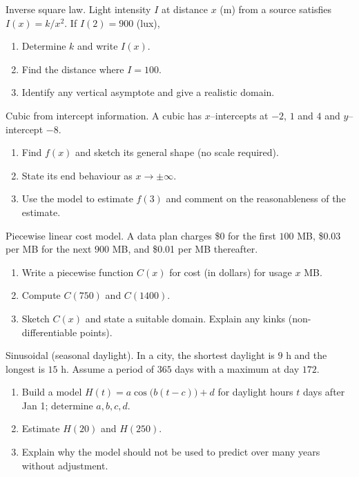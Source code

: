 \documentclass[11pt]{article}
\def\textbf#1{#1}%
\newcounter{question}
\begin{document}
\begin{question}
\textbf{Inverse square law.}
Light intensity $I$ at distance $x$ (m) from a source satisfies $I(x)=k/x^2$. If $I(2)=900$ (lux),
\begin{enumerate}
  \item Determine $k$ and write $I(x)$.
  \item Find the distance where $I=100$.
  \item Identify any vertical asymptote and give a realistic domain.
\end{enumerate}
\end{question}

\begin{question}
\textbf{Cubic from intercept information.}
A cubic has $x$–intercepts at $-2$, $1$ and $4$ and $y$–intercept $-8$.
\begin{enumerate}
  \item Find $f(x)$ and sketch its general shape (no scale required).
  \item State its end behaviour as $x\to\pm\infty$.
  \item Use the model to estimate $f(3)$ and comment on the reasonableness of the estimate.
\end{enumerate}
\end{question}

\begin{question}
\textbf{Piecewise linear cost model.}
A data plan charges \$0 for the first $100$ MB, \$0.03 per MB for the next $900$ MB, and \$0.01 per MB thereafter.
\begin{enumerate}
  \item Write a piecewise function $C(x)$ for cost (in dollars) for usage $x$ MB.
  \item Compute $C(750)$ and $C(1400)$.
  \item Sketch $C(x)$ and state a suitable domain. Explain any kinks (non-differentiable points).
\end{enumerate}
\end{question}

\begin{question}
\textbf{Sinusoidal (seasonal daylight).}
In a city, the shortest daylight is $9$ h and the longest is $15$ h. Assume a period of $365$ days with a maximum at day $172$.
\begin{enumerate}
  \item Build a model $H(t)=a\cos\!\big(b(t-c)\big)+d$ for daylight hours $t$ days after Jan 1; determine $a,b,c,d$.
  \item Estimate $H(20)$ and $H(250)$.
  \item Explain why the model should not be used to predict over many years without adjustment.
\end{enumerate}
\end{question}
\end{document}

